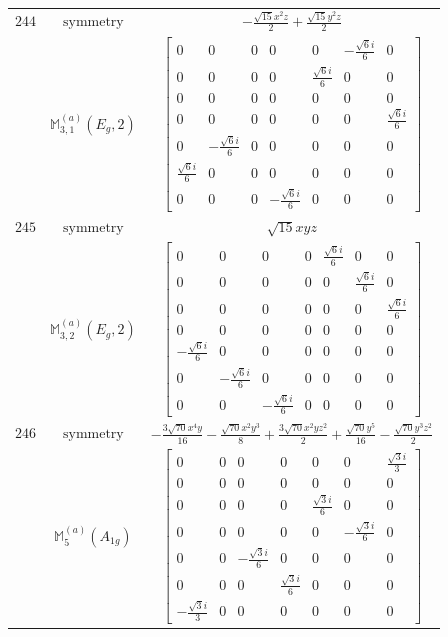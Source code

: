\documentclass[fleqn,8pt,landscape]{jsarticle}
\begin{document}
\begin{longtable}{ccc}
$ 244 $ & $ \text{symmetry} $ & $ - \frac{\sqrt{15} x^{2} z}{2} + \frac{\sqrt{15} y^{2} z}{2} $ \\
$  $ & $ \mathbb{M}_{3,1}^{(a)}(E_{g},2) $ & $ \begin{bmatrix} 0 & 0 & 0 & 0 & 0 & - \frac{\sqrt{6} i}{6} & 0 \\ 0 & 0 & 0 & 0 & \frac{\sqrt{6} i}{6} & 0 & 0 \\ 0 & 0 & 0 & 0 & 0 & 0 & 0 \\ 0 & 0 & 0 & 0 & 0 & 0 & \frac{\sqrt{6} i}{6} \\ 0 & - \frac{\sqrt{6} i}{6} & 0 & 0 & 0 & 0 & 0 \\ \frac{\sqrt{6} i}{6} & 0 & 0 & 0 & 0 & 0 & 0 \\ 0 & 0 & 0 & - \frac{\sqrt{6} i}{6} & 0 & 0 & 0 \end{bmatrix} $ \\ \hline
$ 245 $ & $ \text{symmetry} $ & $ \sqrt{15} x y z $ \\
$  $ & $ \mathbb{M}_{3,2}^{(a)}(E_{g},2) $ & $ \begin{bmatrix} 0 & 0 & 0 & 0 & \frac{\sqrt{6} i}{6} & 0 & 0 \\ 0 & 0 & 0 & 0 & 0 & \frac{\sqrt{6} i}{6} & 0 \\ 0 & 0 & 0 & 0 & 0 & 0 & \frac{\sqrt{6} i}{6} \\ 0 & 0 & 0 & 0 & 0 & 0 & 0 \\ - \frac{\sqrt{6} i}{6} & 0 & 0 & 0 & 0 & 0 & 0 \\ 0 & - \frac{\sqrt{6} i}{6} & 0 & 0 & 0 & 0 & 0 \\ 0 & 0 & - \frac{\sqrt{6} i}{6} & 0 & 0 & 0 & 0 \end{bmatrix} $ \\ \hline
$ 246 $ & $ \text{symmetry} $ & $ - \frac{3 \sqrt{70} x^{4} y}{16} - \frac{\sqrt{70} x^{2} y^{3}}{8} + \frac{3 \sqrt{70} x^{2} y z^{2}}{2} + \frac{\sqrt{70} y^{5}}{16} - \frac{\sqrt{70} y^{3} z^{2}}{2} $ \\
$  $ & $ \mathbb{M}_{5}^{(a)}(A_{1g}) $ & $ \begin{bmatrix} 0 & 0 & 0 & 0 & 0 & 0 & \frac{\sqrt{3} i}{3} \\ 0 & 0 & 0 & 0 & 0 & 0 & 0 \\ 0 & 0 & 0 & 0 & \frac{\sqrt{3} i}{6} & 0 & 0 \\ 0 & 0 & 0 & 0 & 0 & - \frac{\sqrt{3} i}{6} & 0 \\ 0 & 0 & - \frac{\sqrt{3} i}{6} & 0 & 0 & 0 & 0 \\ 0 & 0 & 0 & \frac{\sqrt{3} i}{6} & 0 & 0 & 0 \\ - \frac{\sqrt{3} i}{3} & 0 & 0 & 0 & 0 & 0 & 0 \end{bmatrix} $ \\ \hline

\end{longtable}
\end{document}
